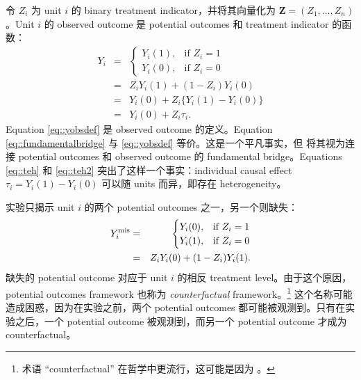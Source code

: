 令 $Z_i$ 为 unit $i$ 的 binary treatment indicator，并将其向量化为 $\boldsymbol{Z} = (Z_1, \ldots, Z_n)$。Unit $i$ 的 observed outcome 是 potential outcomes 和 treatment indicator 的函数：
\begin{eqnarray} 
Y_i &=& \begin{cases}
   Y_i(1),& \text{if } Z_i = 1\\
   Y_i(0), & \text{if } Z_i = 0
\end{cases} \label{eq::yobsdef} \\
&=& Z_i Y_i(1) + (1-Z_i)Y_i(0) \label{eq::fundamentalbridge} \\
&=& Y_i(0)  + Z_i\{  Y_i(1) - Y_i(0)  \} \label{eq::teh} \\
&=&Y_i(0)  + Z_i\tau_i . \label{eq::teh2} 
\end{eqnarray}  
Equation \eqref{eq::yobsdef} 是 observed outcome 的定义。Equation \eqref{eq::fundamentalbridge} 与 \eqref{eq::yobsdef} 等价。这是一个平凡事实，但 \citet{pearl2010brief} 将其视为连接 potential outcomes 和 observed outcome 的 fundamental bridge。Equations \eqref{eq::teh} 和 \eqref{eq::teh2} 突出了这样一个事实：individual causal effect $\tau_i =  Y_i(1) - Y_i(0)  $ 可以随 units 而异，即存在 heterogeneity。


实验只揭示 unit $i$ 的两个 potential outcomes 之一，另一个则缺失：
\begin{eqnarray*} 
Y_i^\textup{mis} &=& \begin{cases}
   Y_i(0),& \text{if } Z_i = 1\\
   Y_i(1), & \text{if } Z_i = 0
\end{cases}  \\
&=& Z_i Y_i(0) + (1-Z_i)Y_i(1) .
\end{eqnarray*}  
缺失的 potential outcome 对应于 unit $i$ 的相反 treatment level。由于这个原因，potential outcomes framework 也称为 {\it counterfactual} framework。\footnote{术语 ``counterfactual'' 在哲学中更流行，这可能是因为 \citet{lewis1973causation}。}
这个名称可能造成困惑，因为在实验之前，两个 potential outcomes 都可能被观测到。只有在实验之后，一个 potential outcome 被观测到，而另一个 potential outcome 才成为 counterfactual。


